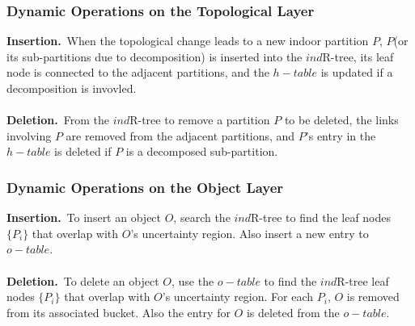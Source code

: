 
\begin{frame}
\frametitle{Dynamic Operations on the Topological Layer}

\textbf{Insertion.}~\textrm{When the topological change leads to a new indoor partition $P$, $P$(or its sub-partitions due to decomposition) is inserted into the $ind$R-tree, its leaf node is connected to the adjacent partitions, and the $h-table$ is updated if a decomposition is invovled.}\\~\\

\textbf{Deletion.}~\textrm{From the $ind$R-tree to remove a partition $P$ to be deleted, the links involving $P$ are removed from the adjacent partitions, and $P$'s entry in the $h-table$ is deleted if $P$ is a decomposed sub-partition.}

\end{frame}


\begin{frame}
\frametitle{Dynamic Operations on the Object Layer}

\textbf{Insertion.}~\textrm{To insert an object $O$, search the $ind$R-tree to find the leaf nodes $\{ P_i \}$ that overlap with $O$'s uncertainty region. Also insert a new entry to $o-table$.}\\~\\

\textbf{Deletion.}~\textrm{To delete an object $O$, use the $o-table$ to find the $ind$R-tree leaf nodes $\{ P_i \}$ that overlap with $O$'s uncertainty region. For each $P_i$, $O$ is removed from its associated bucket. Also the entry for $O$ is deleted from the $o-table$.}

\end{frame}
